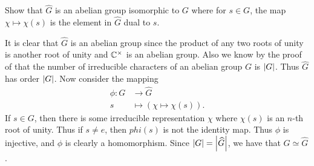 \documentclass[letterpaper, 11pt, oneside]{book}
\begin{document}
\begin{exercise}
  Show that $\widehat{G}$ is an abelian group isomorphic to $G$ where for $s \in G$, the map $\chi \mapsto \chi(s)$ is the element in $\widehat{G}$ dual to $s$.
\end{exercise}
\begin{pf}
  It is clear that $\widehat{G}$ is an abelian group since the product of any two roots of unity is another root of unity and $\mathbb{C}^{\times}$ is an abelian group.
  Also we know by the proof of  that the number of irreducible characters of an abelian group $G$ is $\abs{G}$.
  Thus $\widehat{G}$ has order $\abs{G}$.
  Now consider the mapping
  \begin{align*}
    \phi\colon G &\to \widehat{G} \\
               s &\mapsto (\chi \mapsto \chi(s)).
  \end{align*}
  If $s \in G$, then there is some irreducible representation $\chi$ where $\chi(s)$ is an $n$-th root of unity.
  Thus if $s \neq e$, then $phi(s)$ is not the identity map.
  Thus $\phi$ is injective, and $\phi$ is clearly a homomorphism.
  Since $\abs{G} = \abs{\widehat{G}}$, we have that $G \simeq \widehat{G}$.
\end{pf}

\printbibliography
\end{document}
